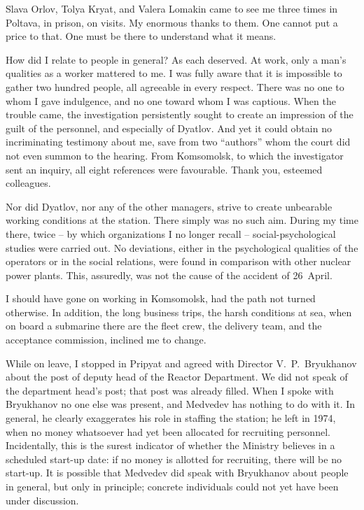 \documentclass[openright]{bookest}
\begin{document}
Slava Orlov, Tolya Kryat, and Valera Lomakin came to see me three times in Poltava, in prison, on visits. My enormous thanks to them. One cannot put a price to that. One must be there to understand what it means.

How did I relate to people in general? As each deserved. At work, only a man's qualities as a worker mattered to me. I was fully aware that it is impossible to gather two hundred people, all agreeable in every respect. There was no one to whom I gave indulgence, and no one toward whom I was captious. When the trouble came, the investigation persistently sought to create an impression of the guilt of the personnel, and especially of Dyatlov. And yet it could obtain no incriminating testimony about me, save from two ``authors'' whom the court did not even summon to the hearing. From Komsomolsk, to which the investigator sent an inquiry, all eight references were favourable. Thank you, esteemed colleagues.

Nor did Dyatlov, nor any of the other managers, strive to create unbearable working conditions at the station. There simply was no such aim. During my time there, twice -- by which organizations I no longer recall -- social-psychological studies were carried out. No deviations, either in the psychological qualities of the operators or in the social relations, were found in comparison with other nuclear power plants. This, assuredly, was not the cause of the accident of 26~April.

I should have gone on working in Komsomolsk, had the path not turned otherwise. In addition, the long business trips, the harsh conditions at sea, when on board a submarine there are the fleet crew, the delivery team, and the acceptance commission, inclined me to change.

While on leave, I stopped in Pripyat and agreed with Director V.~P.~Bryukhanov about the post of deputy head of the Reactor Department. We did not speak of the department head's post; that post was already filled. When I spoke with Bryukhanov no one else was present, and Medvedev has nothing to do with it. In general, he clearly exaggerates his role in staffing the station; he left in 1974, when no money whatsoever had yet been allocated for recruiting personnel. Incidentally, this is the surest indicator of whether the Ministry believes in a scheduled start-up date: if no money is allotted for recruiting, there will be no start-up. It is possible that Medvedev did speak with Bryukhanov about people in general, but only in principle; concrete individuals could not yet have been under discussion.
\end{document}
